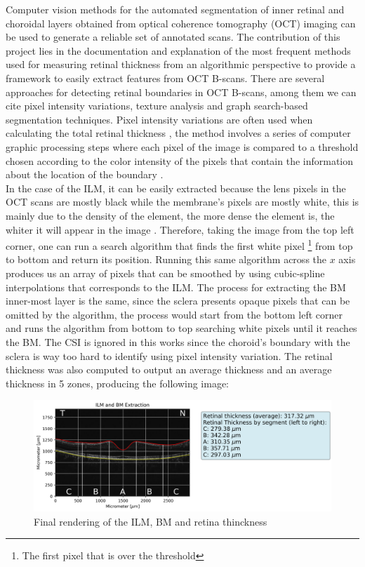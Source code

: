 \documentclass[12pt,a4paper]{scrartcl}
\begin{document}
Computer vision methods for the automated segmentation of inner retinal and choroidal layers obtained from optical coherence tomography (OCT) imaging \cite{Ronchetti2019statistic} can be used to generate a reliable set of annotated scans. 
The contribution of this project lies in the documentation and explanation of the most frequent methods used for measuring retinal thickness from an algorithmic perspective to provide a framework to easily extract features from OCT B-scans. 
There are several approaches for detecting retinal boundaries in OCT B-scans, among them we can cite pixel intensity variations, texture analysis and graph search-based segmentation techniques. Pixel intensity variations are often used when calculating the total retinal thickness \cite{Alonso-Caneiro2013}, the method involves a series of computer graphic processing steps where each pixel of the image is compared to a threshold chosen according to the color intensity of the pixels that contain the information about the location of the boundary \cite{Fabritius:09}. 
\\
In the case of the ILM, it can be easily extracted because the lens pixels in the OCT scans are mostly black while the membrane's pixels are mostly white, this is mainly due to the density of the element, the more dense the element is, the whiter it will appear in the image \cite{Brar597}. Therefore, taking the image from the top left corner, one can run a search algorithm that finds the first white pixel \footnote{The first pixel that is over the threshold} from top to bottom and return its position. Running this same algorithm across the $x$ axis produces us an array of pixels that can be smoothed by using cubic-spline interpolations that corresponds to the ILM. The process for extracting the BM inner-most layer is the same, since the sclera presents opaque pixels that can be omitted by the algorithm, the process would start from the bottom left corner and runs the algorithm from bottom to top searching white pixels until it reaches the BM. The CSI is ignored in this works since the choroid’s boundary with the sclera is way too hard to identify using pixel intensity variation. 
The retinal thickness was also computed to output an average thickness and an average thickness in 5 zones, producing the following image:

\begin{figure}[H]
    \centering
    \includegraphics[width=1\textwidth]{./images/ILM_BM_Extracted.png}
    \caption{Final rendering of the ILM, BM and retina thinckness}
    \label{fig:final_rendering}
\end{figure}
\end{document}
